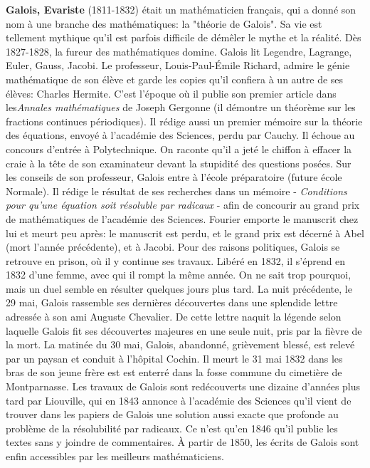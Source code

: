 \textbf{Galois, Evariste} (1811-1832) était un mathématicien français, qui a donné son nom à une branche des mathématiques: la "théorie de Galois". Sa vie est tellement mythique qu'il est parfois difficile de démêler le mythe et la réalité. Dès 1827-1828, la fureur des mathématiques domine. Galois lit Legendre, Lagrange, Euler, Gauss, Jacobi. Le professeur, Louis-Paul-Émile Richard, admire le génie mathématique de son élève et garde les copies qu'il confiera à un autre de ses élèves: Charles Hermite. C'est l'époque où il publie son premier article dans les\textit{Annales mathématiques} de Joseph Gergonne (il démontre un théorème sur les fractions continues périodiques). Il rédige aussi un premier mémoire sur la théorie des équations, envoyé à l'académie des Sciences, perdu par Cauchy. Il échoue au concours d'entrée à Polytechnique. On raconte qu'il a jeté le chiffon à effacer la craie à la tête de son examinateur devant la stupidité des questions posées. Sur les conseils de son professeur, Galois entre à l'école préparatoire (future école Normale). Il rédige le résultat de ses recherches dans un mémoire - \textit{Conditions pour qu'une équation soit résoluble par radicaux} - afin de concourir au grand prix de mathématiques de l'académie des Sciences. Fourier emporte le manuscrit chez lui et meurt peu après: le manuscrit est perdu, et le grand prix est décerné à Abel (mort l'année précédente), et à Jacobi. Pour des raisons politiques, Galois se retrouve en prison, où il y continue ses travaux. Libéré en 1832, il s'éprend en 1832 d'une femme, avec qui il rompt la même année. On ne sait trop pourquoi, mais un duel semble en résulter quelques jours plus tard. La nuit précédente, le 29 mai, Galois rassemble ses dernières découvertes dans une splendide lettre adressée à son ami Auguste Chevalier. De cette lettre naquit la légende selon laquelle Galois fit ses découvertes majeures en une seule nuit, pris par la fièvre de la mort. La matinée du 30 mai, Galois, abandonné, grièvement blessé, est relevé par un paysan et conduit à l'hôpital Cochin. Il meurt le 31 mai 1832 dans les bras de son jeune frère est est enterré dans la fosse commune du cimetière de Montparnasse. Les travaux de Galois sont redécouverts une dizaine d'années plus tard par Liouville, qui en 1843 annonce à l'académie des Sciences qu'il vient de trouver dans les papiers de Galois une solution aussi exacte que profonde au problème de la résolubilité par radicaux. Ce n'est qu'en 1846 qu'il publie les textes sans y joindre de commentaires. À partir de 1850, les écrits de Galois sont enfin accessibles par les meilleurs mathématiciens.

